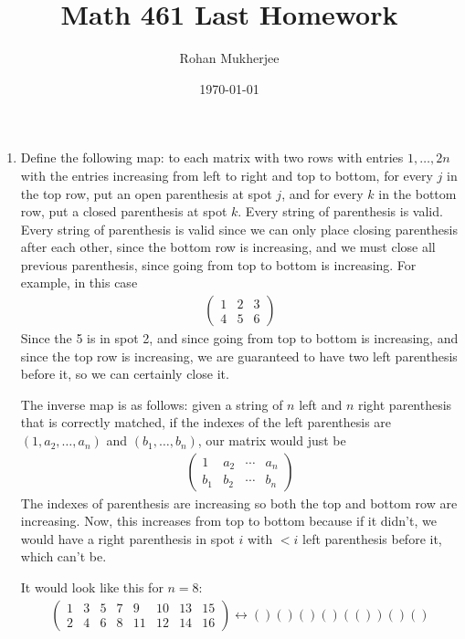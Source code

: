 \documentclass[12pt]{article}
\title{Math 461 Last Homework}
\date{\today}
\author{Rohan Mukherjee}
\theoremstyle{definition}
\theoremstyle{remark}
\begin{document}
	\maketitle
	\begin{enumerate}[leftmargin=\labelsep]
		\item Define the following map: to each matrix with two rows with entries $1, \ldots, 2n$ with the entries increasing from left to right and top to bottom, for every $j$ in the top row, put an open parenthesis at spot $j$, and for every $k$ in the bottom row, put a closed parenthesis at spot $k$. Every string of parenthesis is valid. Every string of parenthesis is valid since we can only place closing parenthesis after each other, since the bottom row is increasing, and we must close all previous parenthesis, since going from top to bottom is increasing. For example, in this case
		\begin{align*}
			\begin{pmatrix} 1 & 2 & 3 \\ 4 & 5 & 6 \end{pmatrix}
		\end{align*}
		Since the 5 is in spot 2, and since going from top to bottom is increasing, and since the top row is increasing, we are guaranteed to have two left parenthesis before it, so we can certainly close it.
		
		The inverse map is as follows: given a string of $n$ left and $n$ right parenthesis that is correctly matched, if the indexes of the left parenthesis are $(1, a_2, \ldots, a_n)$ and $(b_1, \ldots, b_n)$, our matrix would just be
		\begin{align*}
			\begin{pmatrix} 1 & a_2 & \cdots & a_n \\ b_1 & b_2 & \cdots & b_n \end{pmatrix}
		\end{align*}
		The indexes of parenthesis are increasing so both the top and bottom row are increasing. Now, this increases from top to bottom because if it didn't, we would have a right parenthesis in spot $i$ with $< i$ left parenthesis before it, which can't be.
		
		It would look like this for $n=8$:
		\begin{align*}
			\begin{pmatrix} 1 & 3 & 5 & 7 & 9 & 10 & 13 & 15 \\ 2 & 4 & 6 & 8 & 11 & 12 & 14 & 16 \end{pmatrix} \leftrightarrow ()()()()(())()()
		\end{align*}
		

\end{enumerate}
\end{document}
